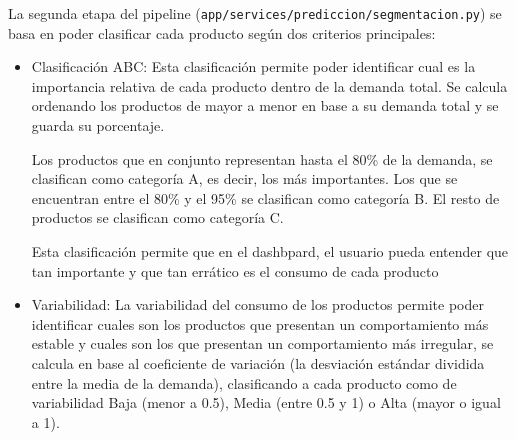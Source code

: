 La segunda etapa del pipeline (\texttt{app/services/prediccion/segmentacion.py}) se basa en poder clasificar cada producto según dos criterios principales:

\begin{itemize}
    \item Clasificación ABC: Esta clasificación permite poder identificar cual es la importancia relativa de cada producto dentro de la demanda total. Se calcula ordenando los productos de mayor a menor en base a su demanda total y se guarda su porcentaje. 
    
    Los productos que en conjunto representan hasta el 80\% de la demanda, se clasifican como categoría A, es decir, los más importantes. Los que se encuentran entre el 80\% y el 95\% se clasifican como categoría B. El resto de productos se clasifican como categoría C.
    
    Esta clasificación permite que en el dashbpard, el usuario pueda entender que tan importante y que tan errático es el consumo de cada producto 
    
    \item Variabilidad: La variabilidad del consumo de los productos permite poder identificar cuales son los productos que presentan un comportamiento más estable y cuales son los que presentan un comportamiento más irregular, se calcula en base al coeficiente de variación (la desviación estándar dividida entre la media de la demanda), clasificando a cada producto como de variabilidad Baja (menor a 0.5), Media (entre 0.5 y 1) o Alta (mayor o igual a 1).

\end{itemize}

